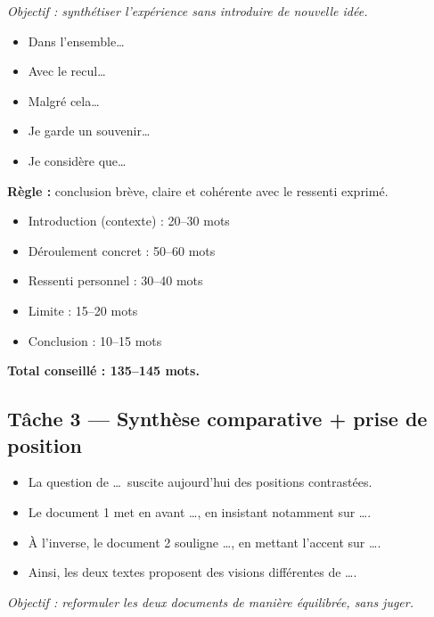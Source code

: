 \documentclass[12pt,a4paper]{article}
\begin{document}

\begin{tcolorbox}[title=\textbf{STEP 5 · Conclure avec une appréciation globale (1 phrase)}]
\emph{Objectif : synthétiser l'expérience sans introduire de nouvelle idée.}

\begin{itemize}
  \item Dans l'ensemble…
  \item Avec le recul…
  \item Malgré cela…
  \item Je garde un souvenir…
  \item Je considère que…
\end{itemize}

\textbf{Règle :} conclusion brève, claire et cohérente avec le ressenti exprimé.
\end{tcolorbox}


\begin{tcolorbox}[title=\textbf{RÉPARTITION IDÉALE (120–150 mots)}]
\begin{itemize}
  \item Introduction (contexte) : 20–30 mots
  \item Déroulement concret : 50–60 mots
  \item Ressenti personnel : 30–40 mots
  \item Limite : 15–20 mots
  \item Conclusion : 10–15 mots
\end{itemize}

\textbf{Total conseillé : 135–145 mots.}
\end{tcolorbox}

\subsection{Tâche 3 — Synthèse comparative + prise de position}


\begin{tcolorbox}[title=\textbf{STEP 1 · Introduction comparative}]

\begin{itemize}
  \item La question de \dots\ suscite aujourd'hui des positions contrastées.
  \item Le document 1 met en avant \dots, en insistant notamment sur \dots.
  \item À l'inverse, le document 2 souligne \dots, en mettant l'accent sur \dots.
  \item Ainsi, les deux textes proposent des visions différentes de \dots.
\end{itemize}

\emph{Objectif : reformuler les deux documents de manière équilibrée, sans juger.}

\end{tcolorbox}
\end{document}
